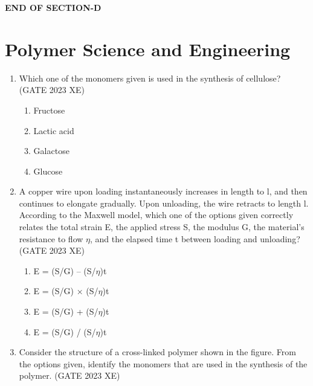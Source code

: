 \documentclass[journal,12pt,onecolumn]{IEEEtran}
\begin{document}
\begin{center}

\item[\textbf{END OF SECTION-D}]

\end{center}

\newpage


\section*{Polymer Science and Engineering}

\begin{enumerate}

\item Which one of the monomers given is used in the synthesis of cellulose?
\hfill{(GATE 2023 XE)}

\begin{multicols}{2}
\begin{enumerate}
\item Fructose
\item Lactic acid
\item Galactose
\item Glucose
\end{enumerate}
\end{multicols}

\item A copper wire upon loading instantaneously increases in length to l, and then continues to elongate gradually. Upon unloading, the wire retracts to length l. According to the Maxwell model, which one of the options given correctly relates the total strain E, the applied stress S, the modulus G, the material’s resistance to flow $\eta$, and the elapsed time t between loading and unloading?
\hfill{(GATE 2023 XE)}

\begin{multicols}{2}
\begin{enumerate}
\item E = (S/G) – (S/$\eta$)t
\item E = (S/G) × (S/$\eta$)t
\item E = (S/G) + (S/$\eta$)t
\item E = (S/G) / (S/$\eta$)t
\end{enumerate}
\end{multicols}

\item Consider the structure of a cross-linked polymer shown in the figure. From the options given, identify the monomers that are used in the synthesis of the polymer.
\hfill{(GATE 2023 XE)}


\end{enumerate}
\end{document}
